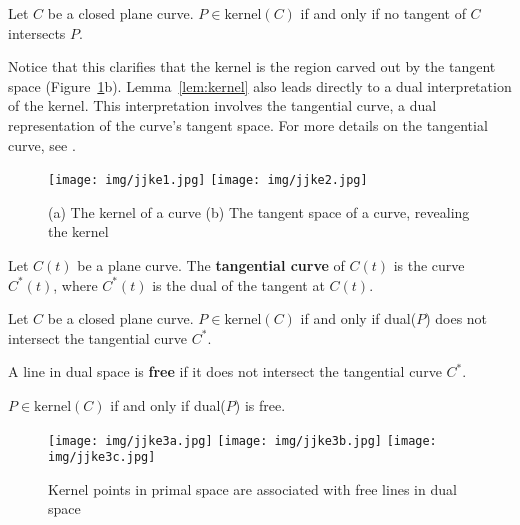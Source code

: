 \documentclass[12pt]{article}
\begin{document}
\begin{lemma}[Elber]
\label{lem:kernel}
Let $C$ be a closed plane curve.
$P \in \mbox{kernel}(C)$ if and only if no tangent of $C$ intersects $P$.
\end{lemma}

Notice that this clarifies that the kernel is the region
carved out by the tangent space (Figure~\ref{fig:kernel}b).
Lemma~\ref{lem:kernel} also leads directly to a dual interpretation of the 
kernel.
This interpretation involves the tangential curve,
a dual representation of the curve's tangent space.
For more details on the tangential curve, see \cite{jj01,jj02}.

\begin{figure}
\begin{center}
\texttt{[image: img/jjke1.jpg]}
\texttt{[image: img/jjke2.jpg]}
\end{center}
\caption{(a) The kernel of a curve (b) The tangent space of a curve, revealing the kernel}
\label{fig:kernel}
\end{figure}

\begin{defn2}
\label{defn:tangentialcurve}
Let $C(t)$ be a plane curve.
The {\bf tangential curve} of $C(t)$ is the curve $C^*(t)$,
where $C^*(t)$ is the dual of the tangent at $C(t)$.
\end{defn2}

\begin{corollary}
Let $C$ be a closed plane curve.
$P \in \mbox{kernel}(C)$ if and only if dual($P$) does not intersect the 
tangential curve $C^*$.
\end{corollary}

\begin{defn2}
A line in dual space is {\bf free} if it does not intersect the 
tangential curve $C^*$.
\end{defn2}

\begin{corollary}
\label{cor:free}
$P \in \mbox{kernel}(C)$ if and only if dual($P$) is free.
\end{corollary}

\begin{figure}
\begin{center}
\texttt{[image: img/jjke3a.jpg]}
\texttt{[image: img/jjke3b.jpg]}
\texttt{[image: img/jjke3c.jpg]}
\end{center}
\caption{Kernel points in primal space are associated with free lines in dual space}
\label{fig:freeline}
\end{figure}
\end{document}
